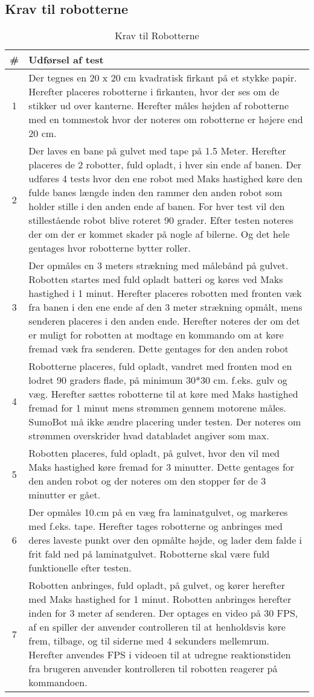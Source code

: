 \subsection{Krav til robotterne}

\begin{table}[]
\centering
\caption{Krav til Robotterne}\label{tab:ASE Krav}
\begin{tabular}{c p{7cm}}
\# & Udførsel af test \\ \midrule
1 & Der tegnes en 20 x 20 cm kvadratisk firkant på et stykke papir. Herefter placeres robotterne i firkanten, hvor der ses om de stikker ud over kanterne. Herefter måles højden af robotterne med en tommestok hvor der noteres om robotterne er højere end 20 cm. \\\midrule
2 & Der laves en bane på gulvet med tape på 1.5 Meter. Herefter placeres de 2 robotter, fuld opladt, i hver sin ende af banen. Der udføres 4 tests hvor den ene robot med Maks hastighed køre den fulde banes længde inden den rammer den anden robot som holder stille i den anden ende af banen. For hver test vil den stillestående robot blive roteret 90 grader. Efter testen noteres der om der er kommet skader på nogle af bilerne. Og det hele gentages hvor robotterne bytter roller. \\\midrule
3 & Der opmåles en 3 meters strækning med målebånd på gulvet. Robotten startes med fuld opladt batteri og køres ved Maks hastighed i 1 minut. Herefter placeres robotten med fronten væk fra banen i den ene ende af den 3 meter strækning opmålt, mens senderen placeres i den anden ende. Herefter noteres der om det er muligt for robotten at modtage en kommando om at køre fremad væk fra senderen. Dette gentages for den anden robot \\\midrule
4 & Robotterne placeres, fuld opladt, vandret med fronten mod en lodret 90 graders flade, på minimum 30*30 cm. f.eks. gulv og væg. Herefter sættes robotterne til at køre med Maks hastighed fremad for 1 minut mens strømmen gennem motorene måles. SumoBot må ikke ændre placering under testen. Der noteres om strømmen overskrider hvad databladet angiver som max.
\\\midrule
5 & Robotten placeres, fuld opladt, på gulvet, hvor den vil med Maks hastighed køre fremad for 3 minutter. Dette gentages for den anden robot og der noteres om den stopper før de 3 minutter er gået. \\\midrule
6 & Der opmåles 10.cm på en væg fra laminatgulvet, og markeres med f.eks. tape. Herefter tages robotterne og anbringes med deres laveste punkt over den opmålte højde, og lader dem falde i frit fald ned på laminatgulvet. Robotterne skal være fuld funktionelle efter testen.  \\\midrule
7 & Robotten anbringes, fuld opladt, på gulvet, og kører herefter med Maks hastighed for 1 minut. Robotten anbringes herefter inden for 3 meter af senderen. Der optages en video på 30 FPS, af en spiller der anvender controlleren til at henholdsvis køre frem, tilbage, og til siderne med 4 sekunders mellemrum. Herefter anvendes FPS i videoen til at udregne reaktionstiden fra brugeren anvender kontrolleren til robotten reagerer på kommandoen. \\\midrule

\end{tabular}
\end{table}
